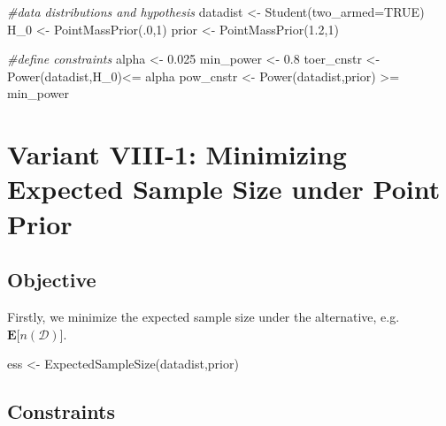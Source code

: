 \documentclass[
]{book}
\newenvironment{Shaded}{\begin{snugshade}}{\end{snugshade}}
\newcommand{\AttributeTok}[1]{\textcolor[rgb]{0.77,0.63,0.00}{#1}}
\newcommand{\CommentTok}[1]{\textcolor[rgb]{0.56,0.35,0.01}{\textit{#1}}}
\newcommand{\ConstantTok}[1]{\textcolor[rgb]{0.00,0.00,0.00}{#1}}
\newcommand{\DecValTok}[1]{\textcolor[rgb]{0.00,0.00,0.81}{#1}}
\newcommand{\FloatTok}[1]{\textcolor[rgb]{0.00,0.00,0.81}{#1}}
\newcommand{\FunctionTok}[1]{\textcolor[rgb]{0.00,0.00,0.00}{#1}}
\newcommand{\NormalTok}[1]{#1}
\newcommand{\OtherTok}[1]{\textcolor[rgb]{0.56,0.35,0.01}{#1}}
\newcommand{\SpecialCharTok}[1]{\textcolor[rgb]{0.00,0.00,0.00}{#1}}
\begin{document}
\begin{Shaded}
\begin{Highlighting}[]
\CommentTok{\#data distributions and hypothesis}
\NormalTok{datadist }\OtherTok{\textless{}{-}} \FunctionTok{Student}\NormalTok{(}\AttributeTok{two\_armed=}\ConstantTok{TRUE}\NormalTok{)}
\NormalTok{H\_0 }\OtherTok{\textless{}{-}} \FunctionTok{PointMassPrior}\NormalTok{(.}\DecValTok{0}\NormalTok{,}\DecValTok{1}\NormalTok{)}
\NormalTok{prior }\OtherTok{\textless{}{-}} \FunctionTok{PointMassPrior}\NormalTok{(}\FloatTok{1.2}\NormalTok{,}\DecValTok{1}\NormalTok{)}

\CommentTok{\#define constraints}
\NormalTok{alpha }\OtherTok{\textless{}{-}} \FloatTok{0.025}
\NormalTok{min\_power }\OtherTok{\textless{}{-}} \FloatTok{0.8}
\NormalTok{toer\_cnstr }\OtherTok{\textless{}{-}} \FunctionTok{Power}\NormalTok{(datadist,H\_0)}\SpecialCharTok{\textless{}=}\NormalTok{ alpha}
\NormalTok{pow\_cnstr }\OtherTok{\textless{}{-}} \FunctionTok{Power}\NormalTok{(datadist,prior) }\SpecialCharTok{\textgreater{}=}\NormalTok{ min\_power}
\end{Highlighting}
\end{Shaded}

\hypertarget{variantVIII_1}{%
\section{Variant VIII-1: Minimizing Expected Sample Size under Point Prior}\label{variantVIII_1}}

\hypertarget{objective-17}{%
\subsection{Objective}\label{objective-17}}

Firstly, we minimize the expected sample size under the alternative, e.g.~\(\boldsymbol{E}\big[n(\mathcal{D})\big]\).

\begin{Shaded}
\begin{Highlighting}[]
\NormalTok{ess }\OtherTok{\textless{}{-}} \FunctionTok{ExpectedSampleSize}\NormalTok{(datadist,prior)}
\end{Highlighting}
\end{Shaded}

\hypertarget{constraints-17}{%
\subsection{Constraints}\label{constraints-17}}
\end{document}
